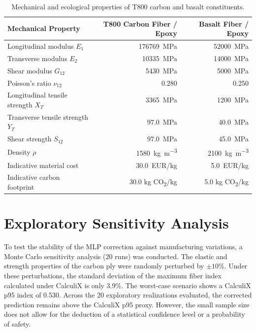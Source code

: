 \documentclass[10pt,twocolumn]{article}
\begin{document}
\begin{table}[h]
\centering
\caption{Mechanical and ecological properties of T800 carbon and basalt constituents.}
\label{tab:material-properties}
\small
\begin{tabular}{lrr}
\toprule
\textbf{Mechanical Property} & \textbf{T800 Carbon Fiber / Epoxy} & \textbf{Basalt Fiber / Epoxy} \\
\midrule
Longitudinal modulus $E_1$ & \SI{176769}{MPa} & \SI{52000}{MPa} \\
Transverse modulus $E_2$ & \SI{10335}{MPa} & \SI{14000}{MPa} \\
Shear modulus $G_{12}$ & \SI{5430}{MPa} & \SI{5000}{MPa} \\
Poisson's ratio $\nu_{12}$ & \num{0.280} & \num{0.250} \\
Longitudinal tensile strength $X_T$ & \SI{3365}{MPa} & \SI{1200}{MPa} \\
Transverse tensile strength $Y_T$ & \SI{97.0}{MPa} & \SI{40.0}{MPa} \\
Shear strength $S_{12}$ & \SI{97.0}{MPa} & \SI{45.0}{MPa} \\
Density $\rho$ & \SI{1580}{kg.m^{-3}} & \SI{2100}{kg.m^{-3}} \\
Indicative material cost & \SI{30.0}{EUR/kg} & \SI{5.0}{EUR/kg} \\
Indicative carbon footprint & \num{30.0} kg CO\textsubscript{2}/kg & \num{5.0} kg CO\textsubscript{2}/kg \\
\bottomrule
\end{tabular}
\end{table}

\section{Exploratory Sensitivity Analysis}

To test the stability of the MLP correction against manufacturing variations, a Monte Carlo sensitivity analysis (20 runs) was conducted. The elastic and strength properties of the carbon ply were randomly perturbed by $\pm 10$\%. Under these perturbations, the standard deviation of the maximum fiber index calculated under CalculiX is only 3.9\%. The worst-case scenario shows a CalculiX p95 index of \num{0.530}. Across the 20 exploratory realizations evaluated, the corrected prediction remains above the CalculiX p95 proxy. However, the small sample size does not allow for the deduction of a statistical confidence level or a probability of safety.
\end{document}
